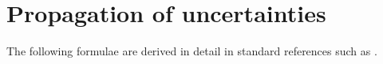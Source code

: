 \documentclass[a4paper,11pt, twocolumn]{article}
\begin{document}
%

\section{Propagation of uncertainties}
The following formulae are derived in detail in standard references such as \cite{GUM2023}.
\end{document}
